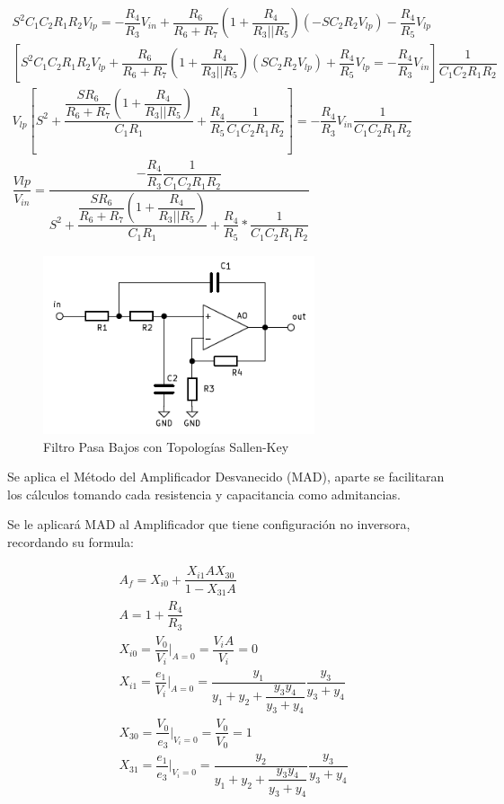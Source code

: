 \begin{enumerate}
            \begin{gather}
                S^2C_1C_2R_1R_2V_{lp}=-\dfrac{R_4}{R_3}V_{in}+ \dfrac{R_6}{R_6+R_7}\left(1+\dfrac{R_4}{R_3||R_5}\right)(-SC_2R_2V_{lp})-\dfrac{R_4}{R_5}V_{lp} \nonumber\\[0.5cm]
                \left[S^2C_1C_2R_1R_2V_{lp}+ \dfrac{R_6}{R_6+R_7}\left(1+\dfrac{R_4}{R_3||R_5}\right)(SC_2R_2V_{lp})+\dfrac{R_4}{R_5}V_{lp}=-\dfrac{R_4}{R_3}V_{in}\right]\dfrac{1}{C_1C_2R_1R_2}\nonumber\\[0.5cm]
                V_{lp}\left[S^2+\dfrac{\dfrac{SR_6}{R_6+R_7}\left(1+\dfrac{R_4}{R_3||R_5}\right)}{C_1R_1}+\dfrac{R_4}{R_5}\dfrac{1}{C_1C_2R_1R_2}\right]=-\dfrac{R_4}{R_3}V_{in}\dfrac{1}{C_1C_2R_1R_2}\nonumber\\[0.5cm]
                \dfrac{V{lp}}{V_{in}}=\dfrac{-\dfrac{R_4}{R_3}\dfrac{1}{C_1C_2R_1R_2}}{S^2+\dfrac{\dfrac{SR_6}{R_6+R_7}\left(1+\dfrac{R_4}{R_3||R_5}\right)}{C_1R_1}+\dfrac{R_4}{R_5}*\dfrac{1}{C_1C_2R_1R_2}} \label{eqn:4}
            \end{gather}
\newpage
            \begin{figure}[H]
                  \centering
                  \includegraphics[width=8cm]{Imagenes/sallen_key.png}
                  \caption{Filtro Pasa Bajos con Topologías Sallen-Key}
                  \label{fig:sallen_key}
            \end{figure}

            Se aplica el Método del Amplificador Desvanecido (MAD), aparte se facilitaran los cálculos tomando cada resistencia y capacitancia como admitancias.

            Se le aplicará MAD al Amplificador que tiene configuración no inversora, recordando su formula:

            \begin{gather*}
                A_f=X_{i0}+\dfrac{X_{i1}AX_{30}}{1-X_{31}A}\\[0.5cm]
                A=1+\dfrac{R_4}{R_3}\\[0.5cm]
                X_{i0}=\dfrac{V_0}{V_i}\bigg|_{A=0}=\dfrac{V_iA}{V_i}=0\\[0.5cm]
                X_{i1}=\dfrac{e_1}{V_i}\bigg|_{A=0}=\dfrac{y_1}{y_1+y_2+\dfrac{y_3y_4}{y_3+y_4}}\dfrac{y_3}{y_3+y_4}\\[0.5cm]
                X_{30}=\dfrac{V_0}{e_3}\bigg|_{V_i=0}=\dfrac{V_0}{V_0}=1\\[0.5cm]
                X_{31}=\dfrac{e_1}{e_3}\bigg|_{V_i=0}=\dfrac{y_2}{y_1+y_2+\dfrac{y_3y_4}{y_3+y_4}}\dfrac{y_3}{y_3+y_4}\\[0.5cm]
            \end{gather*}


\end{enumerate}
